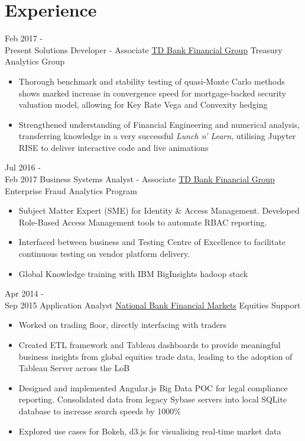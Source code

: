 \documentclass[letterpaper]{twentysecondcv} %
\begin{document}
\section{Experience}

\begin{twenty} %
	\twentyitem
    	{Feb 2017 - \\ Present}
        {Solutions Developer - Associate}
        {\href{http://www.td.com/}{TD Bank Financial Group}}
        {Treasury Analytics Group}
        {
        {\begin{itemize}
        \item Thorough benchmark and stability testing of quasi-Monte Carlo methods shows marked increase in convergence speed for mortgage-backed security valuation model, allowing for Key Rate Vega and Convexity hedging
        \item Strengthened understanding of Financial Engineering and numerical analysis, transferring knowledge in a very successful \emph{Lunch n' Learn}, utilising Jupyter RISE to deliver interactive code and live animations
    \end{itemize}}
        }
        
    \twentyitem
   		{Jul 2016 - \\
   		Feb 2017}
        {Business Systems Analyst - Associate}
        {\href{http://www.td.com/}{TD Bank Financial Group}}
        {Enterprise Fraud Analytics Program}
        {
        {\begin{itemize}
        \item Subject Matter Expert (SME) for Identity \& Access Management. Developed Role-Based Access Management tools to automate RBAC reporting.
        \item Interfaced between business and Testing Centre of Excellence to facilitate continuous testing on vendor platform delivery.
        \item Global Knowledge training with IBM BigInsights hadoop stack
    \end{itemize}}
        }
        
     \twentyitem
   		{Apr 2014 - \\ Sep 2015}
        {Application Analyst}
        {\href{http://nbfm.ca/}{National Bank Financial Markets}}
        {Equities Support}
        {
        \begin{itemize}
		\item Worked on trading floor, directly interfacing with traders
        \item Created ETL framework and Tableau dashboards to provide meaningful business insights from global equities trade data, leading to the adoption of Tableau Server across the LoB
        \item Designed and implemented Angular.js Big Data POC for legal compliance reporting. Consolidated data from legacy Sybase servers into local SQLite database to increase search speeds by 1000\% 
        \item Explored use cases for Bokeh, d3.js for visualising real-time market data
	    \end{itemize}
    	}
        
\end{twenty}
\end{document}
